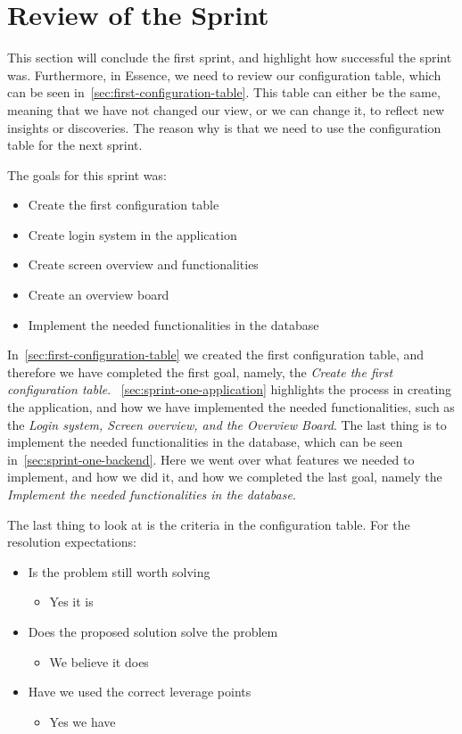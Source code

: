\section{Review of the Sprint}\label{sec:review-sprint-anne}
This section will conclude the first sprint, and highlight how successful the sprint was.
Furthermore, in Essence, we need to review our configuration table, which can be seen in~\autoref{sec:first-configuration-table}.
This table can either be the same, meaning that we have not changed our view, or we can change it, to reflect new insights or discoveries.
The reason why is that we need to use the configuration table for the next sprint.

The goals for this sprint was:

\begin{itemize}
    \item Create the first configuration table
    \item Create login system in the application
    \item Create screen overview and functionalities
    \item Create an overview board
    \item Implement the needed functionalities in the database
\end{itemize}

In~\autoref{sec:first-configuration-table} we created the first configuration table, and therefore we have completed the first goal, namely, the \textit{Create the first configuration table}.
~\autoref{sec:sprint-one-application} highlights the process in creating the application, and how we have implemented the needed functionalities, such as the \textit{Login system, Screen overview, and the Overview Board}.
The last thing is to implement the needed functionalities in the database, which can be seen in~\autoref{sec:sprint-one-backend}.
Here we went over what features we needed to implement, and how we did it, and how we completed the last goal, namely the \textit{Implement the needed functionalities in the database}.

The last thing to look at is the criteria in the configuration table.
For the resolution expectations:

\begin{itemize}
    \item Is the problem still worth solving
    \begin{itemize}
        \item Yes it is
    \end{itemize}
    \item Does the proposed solution solve the problem
    \begin{itemize}
        \item We believe it does
    \end{itemize}
    \item Have we used the correct leverage points
    \begin{itemize}
        \item Yes we have
    \end{itemize}
\end{itemize}

